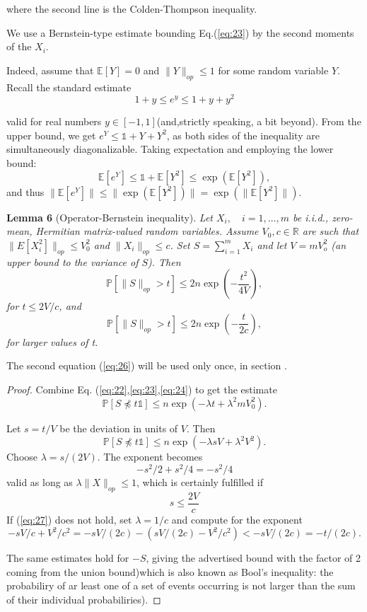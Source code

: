 \documentclass{article}
\begin{document}
where the second line is the Colden-Thompson inequality.

We use a Bernstein-type estimate bounding Eq.(\ref{eq:23}) by the second moments of the $X_i$.

Indeed, assume that $\mathbb{E}[Y] = 0$ and $\|Y\|_{op} \le 1$ for some random variable $Y$. Recall the standard estimate
\[
1+y \le e^y \le 1+y+y^2
\]

valid for real numbers $y\in [-1,1]$(and,strictly speaking, a bit beyond). From the upper bound, we get $e^Y \le \mathbb{1}+Y+Y^2$, as both sides of the inequality are simultaneously diagonalizable. Taking expectation and employing the lower bound:
\begin{equation}
\mathbb{E}[e^Y] \le \mathbb{1} + \mathbb{E}[Y^2] \le \exp(\mathbb{E}[Y^2]),
\label{eq:24}
\end{equation}
and thus $\|\mathbb{E}[e^Y]\| \le \|\exp(\mathbb{E}[Y^2])\| = \exp(\|\mathbb{E}[Y^2]\|)$.

\textbf{Lemma 6} (Operator-Bernstein inequality). \textit{Let $X_i, \quad i = 1, \dots , m$ be i.i.d., zero-mean, Hermitian matrix-valued random variables. Assume $V_0, c \in \mathbb{R}$ are such that $\|E[X_i^2]\|_{op} \le V_0^2$ and $\|X_i\|_{op} \le c$. Set $S = \sum_{i=1}^m X_i$ and let $V = mV_o^2$ (an upper bound to the variance of $S$). Then}
\begin{equation}
\mathbb{P}\left[\|S\|_{op} >  t \right] \le 2n \exp\left(-\dfrac{t^2}{4V}\right), 
\end{equation}
\textit{for $t \le 2V/c$, and}
\begin{equation}
\mathbb{P}[\|S\|_{op}>t] \le 2n \exp\left(-\dfrac{t}{2c}\right),
\label{eq:26}
\end{equation}
\textit{for larger values of t.}

The second equation (\ref{eq:26}) will be used only once, in section \uppercase\expandafter{}.

\begin{proof}
Combine Eq. (\ref{eq:22},\ref{eq:23},\ref{eq:24}) to get the estimate
\[
\mathbb{P}[S \not\preceq t\mathbb{1}] \le n \exp(-\lambda t + \lambda^2 m V_0^2).
\]

Let $s = t/V$ be the deviation in units of $V$. Then
\[
\mathbb{P}[S \not\preceq t\mathbb{1}] \le n \exp(-\lambda sV + \lambda^2 V^2).
\]
Choose $\lambda = s/(2V)$. The exponent becomes
\[
-s^2/2+s^2/4 = -s^2/4
\]
valid as long as $\lambda\|X\|_{op}\le 1$, which is certainly fulfilled if 
\begin{equation}
s \le \dfrac{2V}{c}
\label{eq:27}
\end{equation}
If (\ref{eq:27}) does not hold, set $\lambda = 1/c$ and compute for the exponent
\[
-sV/c + V^2/c^2 = -sV/(2c)-(sV/(2c)-V^2/c^2)<-sV/(2c) = -t/(2c).
\]

The same estimates hold for $-S$, giving the advertised bound with the factor of 2 coming from the union bound)which is also known as Bool's inequality: the probabiliry of ar least one of a set of events occurring is not larger than the sum of their individual probabiliries).

\end{proof}
\end{document}
